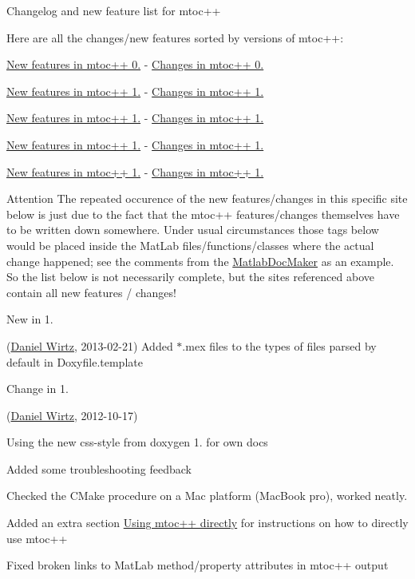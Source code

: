 Changelog and new feature list for mtoc++

Here are all the changes/new features sorted by versions of mtoc++\+:
\begin{DoxyItemize}
\item \hyperlink{newfeat0_1}{New features in mtoc++ 0.} -\/ \hyperlink{changelog0_1}{Changes in mtoc++ 0.}
\item \hyperlink{newfeat1_2}{New features in mtoc++ 1.} -\/ \hyperlink{changelog1_2}{Changes in mtoc++ 1.}
\item \hyperlink{newfeat1_3}{New features in mtoc++ 1.} -\/ \hyperlink{changelog1_3}{Changes in mtoc++ 1.}
\item \hyperlink{newfeat1_4}{New features in mtoc++ 1.} -\/ \hyperlink{changelog1_4}{Changes in mtoc++ 1.}
\item \hyperlink{newfeat1_5}{New features in mtoc++ 1.} -\/ \hyperlink{changelog1_5}{Changes in mtoc++ 1.}
\end{DoxyItemize}

\begin{DoxyAttention}{Attention}
The repeated occurence of the new features/changes in this specific site below is just due to the fact that the mtoc++ features/changes themselves have to be written down somewhere. Under usual circumstances those tags below would be placed inside the Mat\+Lab files/functions/classes where the actual change happened; see the comments from the \hyperlink{class_matlab_doc_maker}{Matlab\+Doc\+Maker} as an example. So the list below is not necessarily complete, but the sites referenced above contain all new features / changes!
\end{DoxyAttention}
\begin{DoxyRefDesc}{New in 1.}
\item[\hyperlink{newfeat1_5__newfeat1_5000001}{New in 1.\+5}](\hyperlink{developers_dw}{Daniel Wirtz}, 2013-\/02-\/21) Added \textquotesingle{}$\ast$.mex\textquotesingle{} files to the types of files parsed by default in Doxyfile.\+template\end{DoxyRefDesc}


\begin{DoxyRefDesc}{Change in 1.}
\item[\hyperlink{changelog1_4__changelog1_4000006}{Change in 1.\+4}](\hyperlink{developers_dw}{Daniel Wirtz}, 2012-\/10-\/17)
\begin{DoxyItemize}
\item Using the new css-\/style from doxygen 1. for own docs
\item Added some troubleshooting feedback
\item Checked the C\+Make procedure on a Mac platform (Mac\+Book pro), worked neatly.
\item Added an extra section \hyperlink{tools_tools_direct}{Using mtoc++ directly} for instructions on how to directly use mtoc++
\item Fixed broken links to Mat\+Lab method/property attributes in mtoc++ output
\end{DoxyItemize}\end{DoxyRefDesc}


